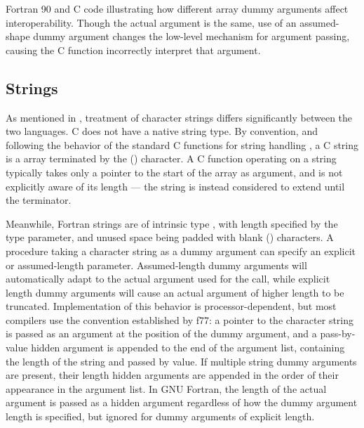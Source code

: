 \begin{listing}
	\inputminted{C}{src/f90/array_types/csrc.c}
	\inputminted{Fortran}{src/f90/array_types/fsrc.f90}
	\caption{Fortran 90 and C code illustrating how different array dummy arguments affect interoperability. Though the actual argument is the same, use of an assumed-shape dummy argument changes the low-level mechanism for argument passing, causing the C function incorrectly interpret that argument.}
	\label{src:f90_arrays}
\end{listing}

\subsection{Strings} \label{sec:interop_f90_strings}

As mentioned in , treatment of character strings differs significantly between the two languages. C does not have a native string type. By convention, and following the behavior of the standard C functions for string handling \cite{C11standard}, a C string is a  array terminated by the  () character. A C function operating on a string typically takes only a pointer to the start of the array as argument, and is not explicitly aware of its length --- the string is instead considered to extend until the  terminator.

Meanwhile, Fortran strings are of intrinsic type , with length specified by the  type parameter, and unused space being padded with blank () characters. A procedure taking a character string as a dummy argument can specify an explicit or assumed-length parameter. Assumed-length dummy arguments will automatically adapt to the actual argument used for the call, while explicit length dummy arguments will cause an actual argument of higher length to be truncated. Implementation of this behavior is processor-dependent, but most compilers use the convention established by f77: a pointer to the character string is passed as an argument at the position of the dummy argument, and a pass-by-value  hidden argument is appended to the end of the argument list, containing the length of the string and passed by value. If multiple string dummy arguments are present, their length hidden arguments are appended in the order of their appearance in the argument list. In GNU Fortran, the length of the actual argument is passed as a hidden argument regardless of how the dummy argument length is specified, but ignored for dummy arguments of explicit length.

